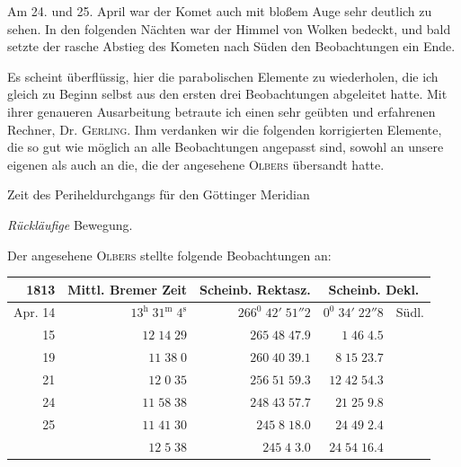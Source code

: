 Am 24. und 25. April war der Komet auch mit bloßem Auge sehr deutlich zu sehen. In den folgenden Nächten war der Himmel von Wolken bedeckt, und bald setzte der rasche Abstieg des Kometen nach Süden den Beobachtungen ein Ende.

\SourceGathering{4\textsuperscript{*}}
Es scheint überflüssig, hier die parabolischen Elemente zu wiederholen, die ich gleich zu Beginn selbst aus den ersten drei Beobachtungen abgeleitet hatte. Mit ihrer genaueren Ausarbeitung betraute ich einen sehr geübten und erfahrenen Rechner, Dr. \textsc{Gerling}. Ihm verdanken wir die folgenden korrigierten Elemente, die so gut wie möglich an alle Beobachtungen angepasst sind, sowohl an unsere eigenen als auch an die, die der angesehene \textsc{Olbers} übersandt hatte.
\par\medskip
\noindent\begin{minipage}{.975\linewidth}\small
\noindent{}\par
\noindent Zeit des Periheldurchgangs für den Göttinger Meridian\par
\noindent{}\par
\noindent{}\par
\noindent{}\par
\noindent{}\par
\noindent \textit{Rückläufige} Bewegung.\par
\end{minipage}\par\medskip

Der angesehene \textsc{Olbers} stellte folgende Beobachtungen an:
\begin{center}\small\setlength{\tabcolsep}{4pt}
\begin{tabular}{r|r|r|r l}
1813&Mittl. Bremer Zeit&Scheinb. Rektasz.&\multicolumn{2}{c}{Scheinb. Dekl.}\\\hline
Apr. 14&$13^{\mathrm h}\;31^{\mathrm m}\;4^{\mathrm s}$&$266^0\;42'\;51''2$&$0^0\;34'\;22''8$&Südl.\\
15&$12\;14\;29$&$265\;48\;47.9$&$1\;46\;4.5$&\\
19&$11\;38\;0$&$260\;40\;39.1$&$8\;15\;23.7$&\\
21&$12\;0\;35$&$256\;51\;59.3$&$12\;42\;54.3$&\\
24&$11\;58\;38$&$248\;43\;57.7$&$21\;25\;9.8$&\\
25&$11\;41\;30$&$245\;8\;18.0$&$24\;49\;2.4$&\\
&$12\;5\;38$&$245\;4\;3.0$&$24\;54\;16.4$&
\end{tabular}\end{center}

